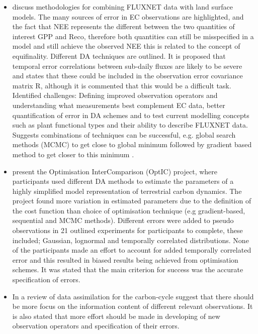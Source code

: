 \documentclass[12pt, a4paper]{article}
\begin{document}
\begin{itemize}

\item \citet{williams2009improving} discuss methodologies for combining FLUXNET data with land surface models. The many sources of error in EC observations are highlighted, and the fact that NEE represents the different between the two quantities of interest GPP and Reco, therefore both quantities can still be misspecified in a model and still achieve the observed NEE this is related to the concept of equifinality.  Different DA techniques are outlined. It is proposed that temporal error correlations between sub-daily fluxes are likely to be severe and states that these could be included in the observation error covariance matrix R, although it is commented that this would be a difficult task. Identified challenges: Defining improved observation operators and understanding what measurements best complement EC data, better quantification of error in DA schemes and to test current modelling concepts such as plant functional types and their ability to describe FLUXNET data. Suggests combinations of techniques can be successful, e.g. global search methods (MCMC) to get close to global minimum followed by gradient based method to get closer to this minimum \citep{vrugt2005improved}.  

\item \citet{trudinger2007optic} present the Optimisation InterComparison (OptIC) project, where participants used different DA methods to estimate the parameters of a highly simplified model representation of terrestrial carbon dynamics. The project found more variation in estimated parameters due to the definition of the cost function than choice of optimisation technique (e.g gradient-based, sequential and MCMC methods). Different errors were added to pseudo observations in 21 outlined experiments for participants to complete, these included; Gaussian, lognormal and temporally correlated distributions. None of the participants made an effort to account for added temporally correlated error and this resulted in biased results being achieved from optimisation schemes. It was stated that the main criterion for success was the accurate specification of errors. 

\item In a review of data assimilation for the carbon-cycle \citet{rayner2010current} suggest that there should be more focus on the information content of different relevant observations. It is also stated that more effort should be made in developing of new observation operators and specification of their errors.

\end{itemize}


{}
\end{document}
